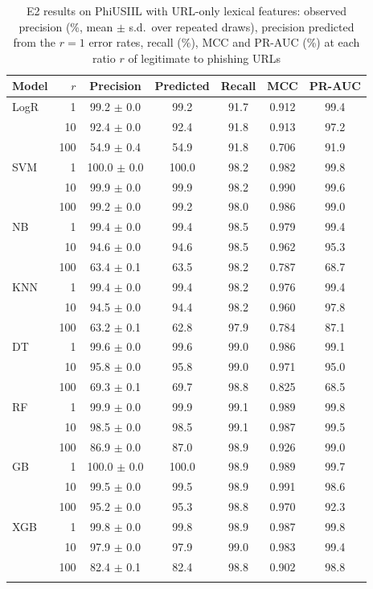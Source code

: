 \documentclass[pdflatex,sn-mathphys-num]{sn-jnl}%
\theoremstyle{thmstyleone}%
\theoremstyle{thmstyletwo}%
\theoremstyle{thmstylethree}%
\begin{document}
\begin{table}[htbp]
\caption{E2 results on PhiUSIIL with URL-only lexical features: observed precision (\%, mean $\pm$ s.d.\ over repeated draws), precision predicted from the $r=1$ error rates, recall (\%), MCC and PR-AUC (\%) at each ratio $r$ of legitimate to phishing URLs}\label{tab:e2-lexical}%
\begin{tabular}{@{}lrccccc@{}}
\toprule
Model & $r$ & Precision & Predicted & Recall & MCC & PR-AUC \\
\midrule
LogR & 1 & 99.2 $\pm$ 0.0 & 99.2 & 91.7 & 0.912 & 99.4 \\
 & 10 & 92.4 $\pm$ 0.0 & 92.4 & 91.8 & 0.913 & 97.2 \\
 & 100 & 54.9 $\pm$ 0.4 & 54.9 & 91.8 & 0.706 & 91.9 \\
SVM & 1 & 100.0 $\pm$ 0.0 & 100.0 & 98.2 & 0.982 & 99.8 \\
 & 10 & 99.9 $\pm$ 0.0 & 99.9 & 98.2 & 0.990 & 99.6 \\
 & 100 & 99.2 $\pm$ 0.0 & 99.2 & 98.0 & 0.986 & 99.0 \\
NB & 1 & 99.4 $\pm$ 0.0 & 99.4 & 98.5 & 0.979 & 99.4 \\
 & 10 & 94.6 $\pm$ 0.0 & 94.6 & 98.5 & 0.962 & 95.3 \\
 & 100 & 63.4 $\pm$ 0.1 & 63.5 & 98.2 & 0.787 & 68.7 \\
KNN & 1 & 99.4 $\pm$ 0.0 & 99.4 & 98.2 & 0.976 & 99.4 \\
 & 10 & 94.5 $\pm$ 0.0 & 94.4 & 98.2 & 0.960 & 97.8 \\
 & 100 & 63.2 $\pm$ 0.1 & 62.8 & 97.9 & 0.784 & 87.1 \\
DT & 1 & 99.6 $\pm$ 0.0 & 99.6 & 99.0 & 0.986 & 99.1 \\
 & 10 & 95.8 $\pm$ 0.0 & 95.8 & 99.0 & 0.971 & 95.0 \\
 & 100 & 69.3 $\pm$ 0.1 & 69.7 & 98.8 & 0.825 & 68.5 \\
RF & 1 & 99.9 $\pm$ 0.0 & 99.9 & 99.1 & 0.989 & 99.8 \\
 & 10 & 98.5 $\pm$ 0.0 & 98.5 & 99.1 & 0.987 & 99.5 \\
 & 100 & 86.9 $\pm$ 0.0 & 87.0 & 98.9 & 0.926 & 99.0 \\
GB & 1 & 100.0 $\pm$ 0.0 & 100.0 & 98.9 & 0.989 & 99.7 \\
 & 10 & 99.5 $\pm$ 0.0 & 99.5 & 98.9 & 0.991 & 98.6 \\
 & 100 & 95.2 $\pm$ 0.0 & 95.3 & 98.8 & 0.970 & 92.3 \\
XGB & 1 & 99.8 $\pm$ 0.0 & 99.8 & 98.9 & 0.987 & 99.8 \\
 & 10 & 97.9 $\pm$ 0.0 & 97.9 & 99.0 & 0.983 & 99.4 \\
 & 100 & 82.4 $\pm$ 0.1 & 82.4 & 98.8 & 0.902 & 98.8 \\
\botrule
\end{tabular}
\end{table}
\end{document}
